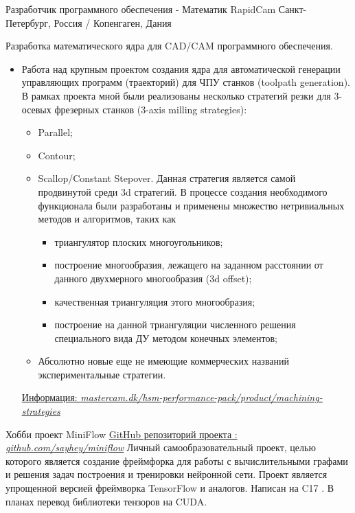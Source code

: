 \documentclass[11pt,a4paper]{moderncv}
\newcommand\Cpp{C\nolinebreak[4]\hspace{-.05em}\raisebox{.4ex}{\relsize{-3}{\textbf{++}}}}
\begin{document}
{Разработчик программного обеспечения - Математик}
{\newline RapidCam}
{\newline Санкт-Петербург, Россия / Копенгаген, Дания}
{}{Разработка математического ядра для CAD/CAM программного обеспечения.\newline{}
\begin{itemize}
\item Работа над крупным проектом создания ядра
      для автоматической генерации управляющих программ (траекторий)
      для ЧПУ станков (toolpath generation). В рамках проекта мной были
      реализованы несколько стратегий резки для 3-осевых фрезерных станков
      (3-axis milling strategies):
  \begin{itemize}%
  \item Parallel;
  \item Contour;
  \item Scallop/Constant Stepover. Данная стратегия является самой продвинутой среди 3d стратегий. В процессе создания необходимого функционала были разработаны и применены множество нетривиальных методов и алгоритмов, таких как
    \begin{itemize}
    \item триангулятор плоских многоугольников;
    \item построение многообразия, лежащего на заданном расстоянии от данного двухмерного многообразия (3d offset);
    \item качественная триангуляция этого многообразия;
    \item построение на данной триангуляции численного решения специального вида ДУ методом конечных элементов;
    \end{itemize}
  \item Абсолютно новые еще не имеющие коммерческих названий экспериментальные стратегии.
  \end{itemize}
  \href{http://www.mastercam.dk/hsm-performance-pack/product/machining-strategies}
       {Информация: \underline{\emph{\textcolor[rgb]{0.00,0.00,0.50}{mastercam.dk/hsm-performance-pack/product/machining-strategies}}}}
\end{itemize}}

\vspace{20 pt}

{Хобби проект}
{\newline MiniFlow}
{}
{\newline \href{https://github.com/SayHey/MiniFlow}
               {GitHub репозиторий проекта : \underline{\emph{\textcolor[rgb]{0.00,0.00,0.50}{github.com/sayhey/miniflow}}}}}
{Личный самообразовательный проект, целью которого является создание фреймфорка для работы с вычислительными графами и решения задач построения и тренировки нейронной сети. Проект является упрощенной версией фреймворка TensorFlow и аналогов. Написан на \Cpp17 . В планах перевод библиотеки тензоров на CUDA.}
\end{document}
